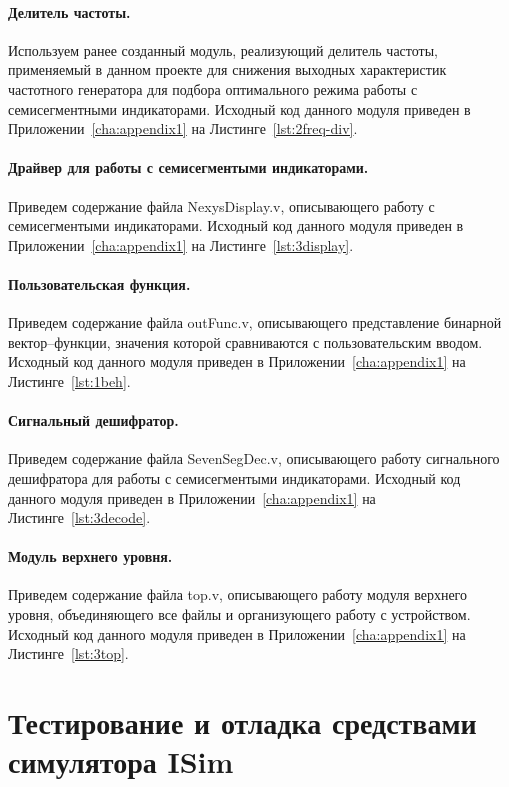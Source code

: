 \paragraph{Делитель частоты.}
Используем ранее созданный модуль, реализующий делитель частоты, применяемый в данном проекте для снижения выходных характеристик частотного генератора для подбора оптимального режима работы с семисегментными индикаторами.
Исходный код данного модуля приведен в Приложении~\ref{cha:appendix1} на Листинге~\ref{lst:2freq-div}.


\paragraph{Драйвер для работы с семисегментыми индикаторами.}
Приведем содержание файла NexysDisplay.v, описывающего работу с семисегментыми индикаторами. Исходный код данного модуля приведен в Приложении~\ref{cha:appendix1} на Листинге~\ref{lst:3display}.

\paragraph{Пользовательская функция.}
Приведем содержание файла outFunc.v, описывающего представление бинарной вектор--функции, значения которой сравниваются с пользовательским вводом. 
Исходный код данного модуля приведен в Приложении~\ref{cha:appendix1} на Листинге~\ref{lst:1beh}.

\paragraph{Сигнальный дешифратор.}
Приведем содержание файла SevenSegDec.v, описывающего работу сигнального дешифратора для работы с семисегментыми индикаторами.
Исходный код данного модуля приведен в Приложении~\ref{cha:appendix1} на Листинге~\ref{lst:3decode}.

\paragraph{Модуль верхнего уровня.}
Приведем содержание файла top.v, описывающего работу модуля верхнего уровня, объединяющего все файлы и организующего работу с устройством.
Исходный код данного модуля приведен в Приложении~\ref{cha:appendix1} на Листинге~\ref{lst:3top}.


\section{Тестирование и отладка средствами симулятора ISim}


